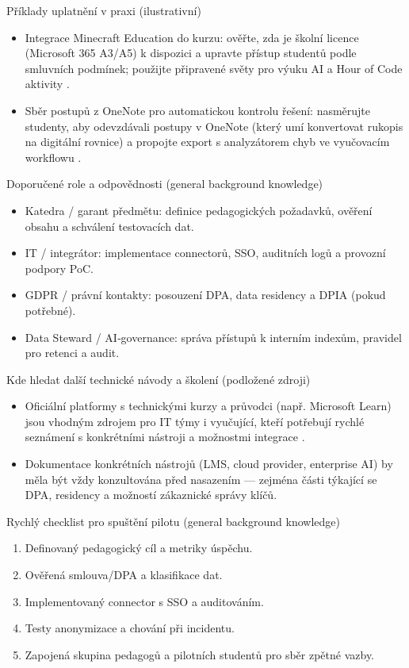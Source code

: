 Příklady uplatnění v praxi (ilustrativní)
\begin{itemize}
  \item Integrace Minecraft Education do kurzu: ověřte, zda je školní licence (Microsoft 365 A3/A5) k dispozici a upravte přístup studentů podle smluvních podmínek; použijte připravené světy pro výuku AI a Hour of Code aktivity \cite{kb_ai_101_tipu_pdf_04e4a115_page_15_2}.
  \item Sběr postupů z OneNote pro automatickou kontrolu řešení: nasměrujte studenty, aby odevzdávali postupy v OneNote (který umí konvertovat rukopis na digitální rovnice) a propojte export s analyzátorem chyb ve vyučovacím workflowu \cite{kb_ai_101_tipu_pdf_04e4a115_page_8_1}.
\end{itemize}

Doporučené role a odpovědnosti (general background knowledge)
\begin{itemize}
  \item Katedra / garant předmětu: definice pedagogických požadavků, ověření obsahu a schválení testovacích dat.
  \item IT / integrátor: implementace connectorů, SSO, auditních logů a provozní podpory PoC.
  \item GDPR / právní kontakty: posouzení DPA, data residency a DPIA (pokud potřebné).
  \item Data Steward / AI‑governance: správa přístupů k interním indexům, pravidel pro retenci a audit.
\end{itemize}

Kde hledat další technické návody a školení (podložené zdroji)
\begin{itemize}
  \item Oficiální platformy s technickými kurzy a průvodci (např. Microsoft Learn) jsou vhodným zdrojem pro IT týmy i vyučující, kteří potřebují rychlé seznámení s konkrétními nástroji a možnostmi integrace \cite{kb_ai_101_tipu_pdf_04e4a115_page_54_1}.
  \item Dokumentace konkrétních nástrojů (LMS, cloud provider, enterprise AI) by měla být vždy konzultována před nasazením — zejména části týkající se DPA, residency a možností zákaznické správy klíčů.
\end{itemize}

Rychlý checklist pro spuštění pilotu (general background knowledge)
\begin{enumerate}
  \item Definovaný pedagogický cíl a metriky úspěchu.
  \item Ověřená smlouva/DPA a klasifikace dat.
  \item Implementovaný connector s SSO a auditováním.
  \item Testy anonymizace a chování při incidentu.
  \item Zapojená skupina pedagogů a pilotních studentů pro sběr zpětné vazby.
\end{enumerate}

